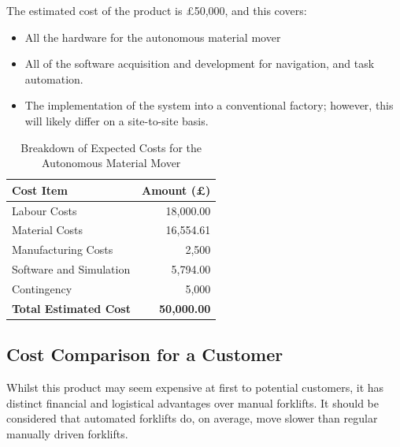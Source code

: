 \documentclass[12pt,titlepage]{article}
\begin{document}
\begin{table}[H]
    \centering
    \begin{minipage}[t]{0.5\textwidth}
        \setlength{\parskip}{0pt} %
        \vspace{-10pt}
        The estimated cost of the product is £50,000, and this covers:
        \vspace{-10pt}
        \begin{itemize}
        \setlength{\itemsep}{0pt}
            \item All the hardware for the autonomous material mover
            \item All of the software acquisition and development for navigation, and task automation.
            \item The implementation of the system into a conventional factory; however, this will likely differ on a site-to-site basis.
        \end{itemize}
    \end{minipage}%
    \hfill
    \begin{minipage}[t]{0.45\textwidth}
        \centering
        \vspace{-10pt}
        \begin{tabular}{|l|r|}
            \hline
            \textbf{Cost Item}          & \textbf{Amount (£)} \\ \hline
            Labour Costs                 & 18,000.00           \\ \hline
            Material Costs              & 16,554.61           \\ \hline
            Manufacturing Costs         & 2,500               \\ \hline
            Software and Simulation     & 5,794.00            \\ \hline
            Contingency                 & 5,000            \\ \hline
            \textbf{Total Estimated Cost} & \textbf{50,000.00}  \\ \hline
        \end{tabular}
        \vspace{-5pt} 
        \caption{Breakdown of Expected Costs for the Autonomous Material Mover}
        \label{tab:expected_costs}
    \end{minipage}
\end{table}

\vspace{-5pt}
\subsection{Cost Comparison for a Customer}
Whilst this product may seem expensive at first to potential customers, it has distinct financial and logistical advantages over manual forklifts. It should be considered that automated forklifts do, on average, move slower than regular manually driven forklifts.
\end{document}
